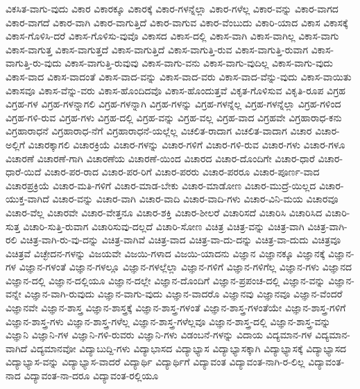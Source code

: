 {ವಿಕಸಿತ-ವಾಗು-ವುದು
ವಿಕಾರ
ವಿಕಾರಕ್ಕೂ
ವಿಕಾರಕ್ಕೆ
ವಿಕಾರ-ಗಳನ್ನೆಲ್ಲಾ
ವಿಕಾರ-ಗಳೆಲ್ಲ
ವಿಕಾರ-ವನ್ನು
ವಿಕಾರ-ವಾಗದ
ವಿಕಾರ-ವಾಗದೆ
ವಿಕಾರ-ವಾಗಿ
ವಿಕಾರ-ವಾಗುತ್ತಿದೆ
ವಿಕಾರ-ವಾಗುವ
ವಿಕಾರ-ವೆಂಬುದು
ವಿಕಾರಿ-ಯಾದ
ವಿಕಾಸ
ವಿಕಾಸಕ್ಕೆ
ವಿಕಾಸ-ಗೊಳಿಸಿ-ದರೆ
ವಿಕಾಸ-ಗೊಳಿಸು-ವುವೊ
ವಿಕಾಸದ
ವಿಕಾಸ-ದಲ್ಲಿ
ವಿಕಾಸ-ವಾಗಿ
ವಿಕಾಸ-ವಾಗಿಲ್ಲ
ವಿಕಾಸ-ವಾಗು
ವಿಕಾಸ-ವಾಗುತ್ತ
ವಿಕಾಸ-ವಾಗುತ್ತದೆ
ವಿಕಾಸ-ವಾಗುತ್ತಿದೆ
ವಿಕಾಸ-ವಾಗುತ್ತಿ-ರುವ
ವಿಕಾಸ-ವಾಗುತ್ತಿ-ರುವಾಗ
ವಿಕಾಸ-ವಾಗುತ್ತಿ-ರು-ವುದು
ವಿಕಾಸ-ವಾಗುತ್ತಿ-ರುವುವು
ವಿಕಾಸ-ವಾಗು-ವನು
ವಿಕಾಸ-ವಾಗು-ವುದಿಲ್ಲ
ವಿಕಾಸ-ವಾಗು-ವುದು
ವಿಕಾಸ-ವಾದ
ವಿಕಾಸ-ವಾದಂತೆ
ವಿಕಾಸ-ವಾದ-ವನ್ನು
ವಿಕಾಸ-ವಾದ-ವರು
ವಿಕಾಸ-ವಾದ-ವೆನ್ನು-ವುದು
ವಿಕಾಸ-ವಾಯಿತು
ವಿಕಾಸವೂ
ವಿಕಾಸ-ವೆನ್ನು-ವರು
ವಿಕಾಸ-ಹೊಂದಿದವೊ
ವಿಕಾಸ-ಹೊಂದುತ್ತವೆ
ವಿಕೃತ-ಗೊಳಿಸುವ
ವಿಕೃತಿ-ರೂಪ
ವಿಗ್ರಹ
ವಿಗ್ರಹ-ಗಳ
ವಿಗ್ರಹ-ಗಳನ್ನಾಗಲಿ
ವಿಗ್ರಹ-ಗಳನ್ನಾಗಿ
ವಿಗ್ರಹ-ಗಳನ್ನು
ವಿಗ್ರಹ-ಗಳನ್ನೆಲ್ಲ
ವಿಗ್ರಹ-ಗಳನ್ನೆಲ್ಲಾ
ವಿಗ್ರಹ-ಗಳಿಂದ
ವಿಗ್ರಹ-ಗಳಿ-ರುವ
ವಿಗ್ರಹ-ಗಳು
ವಿಗ್ರಹ-ದಲ್ಲಿ
ವಿಗ್ರಹ-ವನ್ನು
ವಿಗ್ರಹ-ವಲ್ಲ
ವಿಗ್ರಹ-ವಾದ
ವಿಗ್ರಹವೇ
ವಿಗ್ರಹಾರಾಧ-ಕನು
ವಿಗ್ರಹಾರಾಧನೆ
ವಿಗ್ರಹಾರಾಧ-ನೆಗೆ
ವಿಗ್ರಹಾರಾಧನೆ-ಯಲ್ಲೆಲ್ಲ
ವಿಚಲಿತ-ರಾದಾಗ
ವಿಚಲಿತ-ವಾದಾಗ
ವಿಚಾರ
ವಿಚಾರ-ಅಲ್ಲಿಗೆ
ವಿಚಾರಕ್ಕಾಗಲಿ
ವಿಚಾರಕ್ರಿಯೆ
ವಿಚಾರ-ಗಳನ್ನು
ವಿಚಾರ-ಗಳಿಗೆ
ವಿಚಾರ-ಗಳಿ-ರುವ
ವಿಚಾರ-ಗಳು
ವಿಚಾರ-ಗಳೂ
ವಿಚಾರಣೆ
ವಿಚಾರಣೆ-ಗಾಗಿ
ವಿಚಾರಣೆಯ
ವಿಚಾರಣೆ-ಯಿಂದ
ವಿಚಾರದ
ವಿಚಾರ-ದೊಂದಿಗೇ
ವಿಚಾರ-ಧಾರೆ
ವಿಚಾರ-ಧಾರೆ-ಯಿದೆ
ವಿಚಾರ-ಪರ-ರಾದ
ವಿಚಾರ-ಪರ-ರಿಗೆ
ವಿಚಾರ-ಪರರು
ವಿಚಾರ-ಪರರೂ
ವಿಚಾರ-ಪೂರ್ಣ-ವಾದ
ವಿಚಾರಪ್ರಕ್ರಿಯೆ
ವಿಚಾರ-ಮತಿ-ಗಳಿಗೆ
ವಿಚಾರ-ಮಾಡ-ಬೇಕು
ವಿಚಾರ-ಮಾಡೋಣ
ವಿಚಾರ-ಮುದ್ರೆ-ಯಿಲ್ಲದ
ವಿಚಾರ-ಯುಕ್ತ-ವಾಗಿದೆ
ವಿಚಾರ-ವನ್ನು
ವಿಚಾರ-ವಾಗಿ
ವಿಚಾರ-ವಾದಿ
ವಿಚಾರ-ವಾದಿ-ಗಳು
ವಿಚಾರ-ವಿನಿ-ಮಯ
ವಿಚಾರವೂ
ವಿಚಾರ-ವೆಲ್ಲ
ವಿಚಾರವೇ
ವಿಚಾರ-ವೇತ್ತನೂ
ವಿಚಾರ-ಶಕ್ತಿ
ವಿಚಾರ-ಶೀಲರೆ
ವಿಚಾರಿಸದೆ
ವಿಚಾರಿಸಿ
ವಿಚಾರಿಸಿದ
ವಿಚಾರಿ-ಸುತ್ತ
ವಿಚಾರಿ-ಸುತ್ತಿ-ರುವಾಗ
ವಿಚಾರಿಸುವು-ದಲ್ಲದೆ
ವಿಚಾರಿ-ಸೋಣ
ವಿಚಿತ್ರ
ವಿಚಿತ್ರ-ವನ್ನು
ವಿಚಿತ್ರ-ವಾಗಿ
ವಿಚಿತ್ರ-ವಾಗಿ-ರಲಿ
ವಿಚಿತ್ರ-ವಾಗಿ-ರು-ವು-ದನ್ನು
ವಿಚಿತ್ರ-ವಾಗಿವೆ
ವಿಚಿತ್ರ-ವಾದ
ವಿಚಿತ್ರ-ವಾ-ದು-ದನ್ನು
ವಿಚಿತ್ರ-ವಾ-ದುದು
ವಿಚಿತ್ರವೂ
ವಿಚಿತ್ರವೆ
ವಿಚ್ಛೇದನ-ಗಳನ್ನು
ವಿಜಯವೇ
ವಿಜಯಿ-ಗಳಾದ
ವಿಜಯಿ-ಯಾದನು
ವಿಜ್ಞಾನ
ವಿಜ್ಞಾನಕ್ಕೂ
ವಿಜ್ಞಾನಕ್ಕೆ
ವಿಜ್ಞಾನ-ಗಳ
ವಿಜ್ಞಾನ-ಗಳಂತೆ
ವಿಜ್ಞಾನ-ಗಳಲ್ಲೂ
ವಿಜ್ಞಾನ-ಗಳಲ್ಲೆಲ್ಲಾ
ವಿಜ್ಞಾನ-ಗಳಿಗೆ
ವಿಜ್ಞಾನ-ಗಳಿಗೆಲ್ಲ
ವಿಜ್ಞಾನ-ಗಳು
ವಿಜ್ಞಾನದ
ವಿಜ್ಞಾನ-ದಲ್ಲಿ
ವಿಜ್ಞಾನ-ದಲ್ಲಿಯೂ
ವಿಜ್ಞಾನ-ದಲ್ಲೇ
ವಿಜ್ಞಾನ-ದೊಂದಿಗೆ
ವಿಜ್ಞಾನ-ಪ್ರಪಂಚ-ದಲ್ಲಿ
ವಿಜ್ಞಾನ-ವನ್ನು
ವಿಜ್ಞಾನ-ವನ್ನೇ
ವಿಜ್ಞಾನ-ವಾಗಿ-ರುವುದು
ವಿಜ್ಞಾನ-ವಾಗು-ವುದು
ವಿಜ್ಞಾನ-ವಾದರೊ
ವಿಜ್ಞಾನವು
ವಿಜ್ಞಾನವೂ
ವಿಜ್ಞಾನ-ವೆಂದರೆ
ವಿಜ್ಞಾನವೇ
ವಿಜ್ಞಾನ-ಶಾಸ್ತ್ರ
ವಿಜ್ಞಾನ-ಶಾಸ್ತ್ರಕ್ಕೆ
ವಿಜ್ಞಾನ-ಶಾಸ್ತ್ರ-ಗಳಂತೆ
ವಿಜ್ಞಾನ-ಶಾಸ್ತ್ರ-ಗಳಂತೆಯೇ
ವಿಜ್ಞಾನ-ಶಾಸ್ತ್ರ-ಗಳಿಗೆ
ವಿಜ್ಞಾನ-ಶಾಸ್ತ್ರ-ಗಳು
ವಿಜ್ಞಾನ-ಶಾಸ್ತ್ರ-ಗಳೆಲ್ಲ
ವಿಜ್ಞಾನ-ಶಾಸ್ತ್ರ-ಗಳೆಲ್ಲವೂ
ವಿಜ್ಞಾನ-ಶಾಸ್ತ್ರ-ದಲ್ಲಿ
ವಿಜ್ಞಾನ-ಶಾಸ್ತ್ರ-ವನ್ನು
ವಿಜ್ಞಾನಿ
ವಿಜ್ಞಾನಿ-ಗಳ
ವಿಜ್ಞಾನಿ-ಗಳಿ-ರುವರು
ವಿಜ್ಞಾನಿ-ಗಳು
ವಿಡಂಬನೆ-ಗಳನ್ನು
ವಿದಾಯ
ವಿದ್ಯಮಾನ-ಗಳ
ವಿದ್ಯಮಾನ-ವಾಗಿದೆ
ವಿದ್ಯಮಾನವೋ
ವಿದ್ಯಾಬುದ್ದಿ-ಗಳು
ವಿದ್ಯಾಭಾಸದ
ವಿದ್ಯಾಭ್ಯಾಸ
ವಿದ್ಯಾಭ್ಯಾಸಕ್ಕಾಗಿ
ವಿದ್ಯಾಭ್ಯಾಸಕ್ಕೆ
ವಿದ್ಯಾಭ್ಯಾಸದ
ವಿದ್ಯಾಭ್ಯಾಸ-ವನ್ನು
ವಿದ್ಯಾಭ್ಯಾಸ-ವಾದರೆ
ವಿದ್ಯಾರ್ಥಿ
ವಿದ್ಯಾರ್ಥಿಗೆ
ವಿದ್ಯಾವಂತ
ವಿದ್ಯಾವಂತ-ನಾಗಿ-ರ-ಲಿಲ್ಲ
ವಿದ್ಯಾವಂತ-ನಾದ
ವಿದ್ಯಾವಂತ-ನಾ-ದರೂ
ವಿದ್ಯಾವಂತ-ರಲ್ಲಿಯೂ
}
